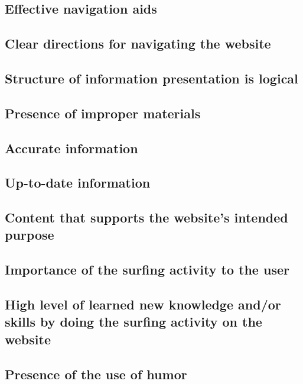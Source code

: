         \subsection{Effective navigation aids}

        \subsection{Clear directions for navigating the website}

        \subsection{Structure of information presentation is logical}

        \subsection{Presence of improper materials}

        \subsection{Accurate information}

        \subsection{Up-to-date information}

        \subsection{Content that supports the website's intended purpose}

        \subsection{Importance of the surfing activity to the user}

        \subsection{High level of learned new knowledge and/or skills by doing the surfing activity on the website}

        \subsection{Presence of the use of humor}

